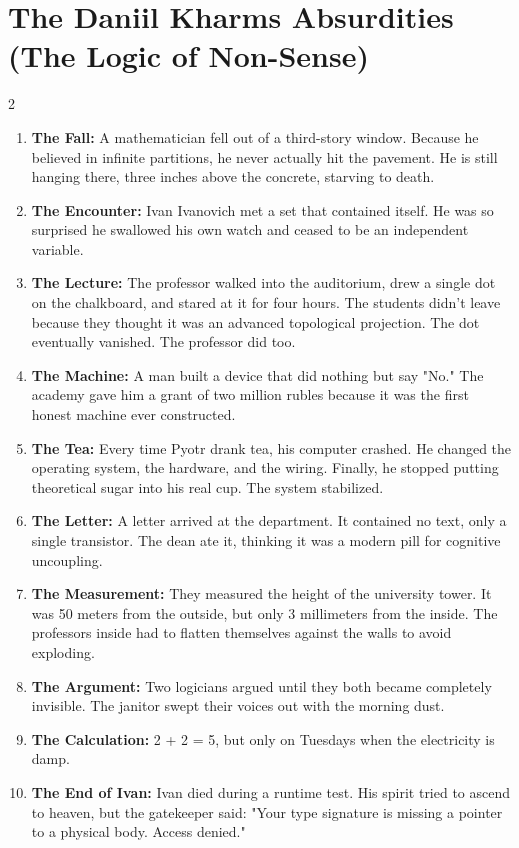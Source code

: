 \documentclass[12pt,a4paper]{article}
\begin{document}
\section{The Daniil Kharms Absurdities (The Logic of Non-Sense)}
\begin{multicols}{2}
\begin{enumerate}
    \item \textbf{The Fall:} A mathematician fell out of a third-story window. Because he believed in infinite partitions, he never actually hit the pavement. He is still hanging there, three inches above the concrete, starving to death.
    \item \textbf{The Encounter:} Ivan Ivanovich met a set that contained itself. He was so surprised he swallowed his own watch and ceased to be an independent variable.
    \item \textbf{The Lecture:} The professor walked into the auditorium, drew a single dot on the chalkboard, and stared at it for four hours. The students didn't leave because they thought it was an advanced topological projection. The dot eventually vanished. The professor did too.
    \item \textbf{The Machine:} A man built a device that did nothing but say "No." The academy gave him a grant of two million rubles because it was the first honest machine ever constructed.
\clearpage
    \item \textbf{The Tea:} Every time Pyotr drank tea, his computer crashed. He changed the operating system, the hardware, and the wiring. Finally, he stopped putting theoretical sugar into his real cup. The system stabilized.
    \item \textbf{The Letter:} A letter arrived at the department. It contained no text, only a single transistor. The dean ate it, thinking it was a modern pill for cognitive uncoupling.
    \item \textbf{The Measurement:} They measured the height of the university tower. It was 50 meters from the outside, but only 3 millimeters from the inside. The professors inside had to flatten themselves against the walls to avoid exploding.
    \item \textbf{The Argument:} Two logicians argued until they both became completely invisible. The janitor swept their voices out with the morning dust.
    \item \textbf{The Calculation:} 2 + 2 = 5, but only on Tuesdays when the electricity is damp.
    \item \textbf{The End of Ivan:} Ivan died during a runtime test. His spirit tried to ascend to heaven, but the gatekeeper said: "Your type signature is missing a pointer to a physical body. Access denied."
\end{enumerate}
\end{multicols}
\end{document}
